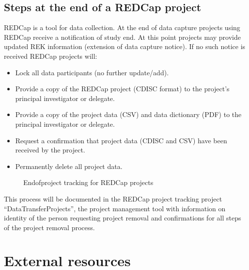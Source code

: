 \documentclass[letterpaper,10pt,english]{sphinxmanual}
\begin{document}
\subsection{Steps at the end of a REDCap project}
\label{\detokenize{EndUser/index:steps-at-the-end-of-a-redcap-project}}
\sphinxAtStartPar
REDCap is a tool for data collection. At the end of data capture projects using REDCap receive a notification of study end. At this point projects may provide updated REK information (extension of data capture notice). If no such notice is received REDCap projects will:
\begin{itemize}
\item {} 
\sphinxAtStartPar
Lock all data participants (no further update/add).

\item {} 
\sphinxAtStartPar
Provide a copy of the REDCap project (CDISC format) to the project’s principal investigator or delegate.

\item {} 
\sphinxAtStartPar
Provide a copy of the project data (CSV) and data dictionary (PDF) to the principal investigator or delegate.

\item {} 
\sphinxAtStartPar
Request a confirmation that project data (CDISC and CSV) have been received by the project.

\item {} 
\sphinxAtStartPar
Permanently delete all project data.

\end{itemize}

\begin{figure}[htbp]
\centering
\capstart

\noindent{}
\caption{End\sphinxhyphen{}of\sphinxhyphen{}project tracking for REDCap projects}\label{\detokenize{EndUser/index:id8}}\end{figure}

\sphinxAtStartPar
This process will be documented in the REDCap project tracking project “DataTransferProjects”, the project management tool with information on identity of the person requesting project removal and confirmations for all steps of the project removal process.


\section{External resources}
\label{\detokenize{EndUser/index:external-resources}}
\end{document}
